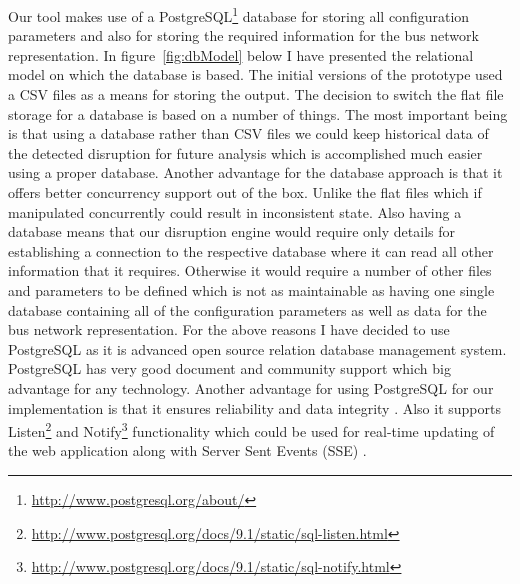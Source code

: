 Our tool makes use of a PostgreSQL\footnote{\url{http://www.postgresql.org/about/}} database for storing all configuration parameters and also for storing the required information for the bus network representation. In figure~\ref{fig:dbModel} below I have presented the relational model on which the database is based. The initial versions of the prototype used a CSV files as a means for storing the output. The decision to switch the flat file storage for a database is based on a number of things. The most important being is that using a database rather than CSV files we could keep historical data of the detected disruption for future analysis which is accomplished much easier using a proper database. Another advantage for the database approach is that it offers better concurrency support out of the box. Unlike the flat files which if manipulated concurrently could result in inconsistent state. Also having a database means that our disruption engine would require only details for establishing a connection to the respective database where it can read all other information that it requires. Otherwise it would require a number of other files and parameters to be defined which is not as maintainable as having one single database containing all of the configuration parameters as well as data for the bus network representation. For the above reasons I have decided to use PostgreSQL as it is advanced open source relation database management system. PostgreSQL has very good document and community support which big advantage for any technology. Another advantage for using PostgreSQL for our implementation is that it ensures reliability and data integrity \cite{lerner2007open}. Also it supports Listen\footnote{\url{http://www.postgresql.org/docs/9.1/static/sql-listen.html}} and Notify\footnote{\url{http://www.postgresql.org/docs/9.1/static/sql-notify.html}} functionality which could be used for real-time updating of the web application along with Server Sent Events (SSE) \cite{serverSentEvents}.

